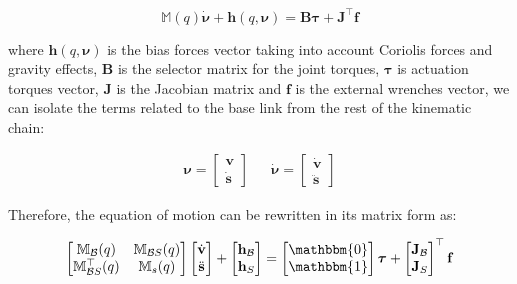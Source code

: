 \begin{equation}
    \mathbb{M}(q)\dot{\boldsymbol{\nu}} + \mathbf{h}(q,\boldsymbol{\nu}) = \mathbf{B}\boldsymbol{\tau} + \mathbf{J} ^\top \mathbf{f}
\end{equation}

where $\mathbf{h}(q,\boldsymbol{\nu})$ is the bias forces vector taking into account Coriolis forces and gravity effects, $\mathbf{B}$ is the selector matrix for the joint torques, $\boldsymbol{\tau}$ is actuation torques vector, $\mathbf{J}$ is the Jacobian matrix and $\mathbf{f}$ is the external wrenches vector, we can isolate the terms related to the base link from the rest of the kinematic chain:

\begin{align}
    \boldsymbol{\nu} =
    \begin{bmatrix}
        \mathrm{\mathbf{v}} \\
        \dot{\mathbf{s}}
    \end{bmatrix} &  &
    \dot{\boldsymbol{\nu}} =
    \begin{bmatrix}
        \dot{\mathrm{\mathbf{v}}} \\
        \ddot{\mathbf{s}}
    \end{bmatrix}
\end{align}

Therefore, the equation of motion can be rewritten in its matrix form as:

\begin{equation}
    \begin{bmatrix}
        \mathbb{M} _{\mathcal{B}}(q)        & \mathbb{M} _{\mathcal{B}S}(q) \\
        \mathbb{M} _{\mathcal{B}S} ^\top(q) & \mathbb{M} _s(q)
    \end{bmatrix}
    \begin{bmatrix}
        \dot{\mathrm{\mathbf{v}}} \\
        \ddot{\mathbf{s}}
    \end{bmatrix}+
    \begin{bmatrix}
        \mathbf{h} _{\mathcal{B}} \\
        \mathbf{h} _S
    \end{bmatrix}=
    \begin{bmatrix}
        \mathbbm{0} \\
        \mathbbm{1}
    \end{bmatrix}
    \boldsymbol{\tau}
    +
    \begin{bmatrix}
        \mathbf{J} _{\mathcal{B}} \\
        \mathbf{J} _S
    \end{bmatrix} ^\top
    \mathbf{f}
\end{equation}

